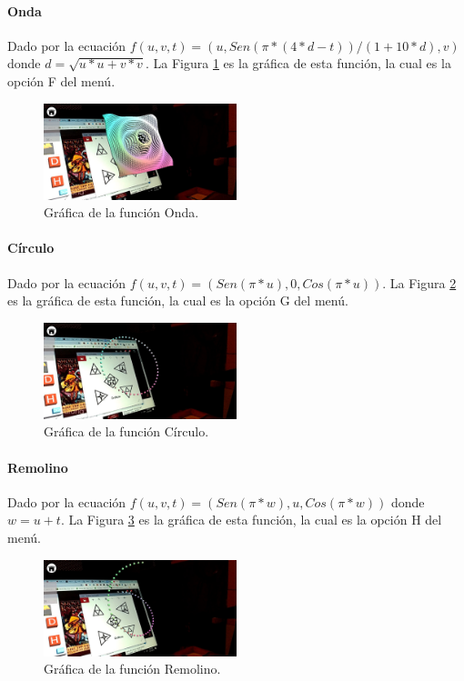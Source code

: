 \paragraph{Onda}
Dado por la ecuación $f(u,v,t)=(u, Sen(\pi * (4 * d - t))/(1 + 10 * d),v)$ donde $d=\sqrt{u * u + v * v}$. La Figura \ref{fig:graf_onda} es la gráfica de esta función, la cual es la opción F del menú.

\begin{figure}[hbt!]
\centering
\includegraphics[width=0.5\textwidth]{figuras/graficas/onda.png}
\caption{\label{fig:graf_onda}Gráfica de la función Onda.}
\end{figure}
\FloatBarrier

\paragraph{Círculo}
Dado por la ecuación $f(u,v,t)=(Sen(\pi * u), 0,Cos(\pi * u))$. La Figura \ref{fig:graf_circulo} es la gráfica de esta función, la cual es la opción G del menú.

\begin{figure}[hbt!]
\centering
\includegraphics[width=0.5\textwidth]{figuras/graficas/circulo.png}
\caption{\label{fig:graf_circulo}Gráfica de la función Círculo.}
\end{figure}
\FloatBarrier

\paragraph{Remolino}
Dado por la ecuación $f(u,v,t)=(Sen(\pi * w), u, Cos(\pi * w))$ donde $w = u + t$. La Figura \ref{fig:graf_remolino} es la gráfica de esta función, la cual es la opción H del menú.

\begin{figure}[hbt!]
\centering
\includegraphics[width=0.5\textwidth]{figuras/graficas/remolino.png}
\caption{\label{fig:graf_remolino}Gráfica de la función Remolino.}
\end{figure}
\FloatBarrier

